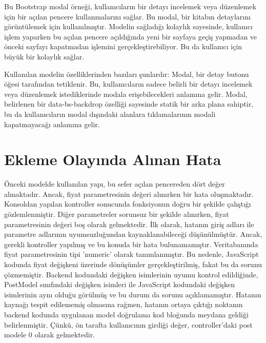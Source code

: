 \documentclass[12pt, a4paper]{article}
\begin{document}
Bu Bootstrap modal örneği, kullanıcıların bir detayı incelemek veya düzenlemek için bir açılan pencere kullanmalarını sağlar. Bu modal, bir kitabın detaylarını görüntülemek için kullanılmıştır. Modelin sağladığı kolaylık sayesinde, kullanıcı işlem yaparken bu açılan pencere açıldığında yeni bir sayfaya geçiş yapmadan ve önceki sayfayı kapatmadan işlemini gerçekleştirebiliyor. Bu da kullanıcı için büyük bir kolaylık sağlar.

Kullanılan modelin özelliklerinden bazıları şunlardır:
Modal, bir detay butonu öğesi tarafından tetiklenir. Bu, kullanıcıların sadece belirli bir detayı incelemek veya düzenlemek istediklerinde modala erişebilecekleri anlamına gelir. \newline
Modal, belirlenen bir data-bs-backdrop özelliği sayesinde statik bir arka plana sahiptir, bu da kullanıcıların modal dışındaki alanlara tıklamalarının modali kapatmayacağı anlamına gelir.
\newpage

\section{Ekleme Olayında Alınan Hata}
Önceki modelde kullanılan yapı, bu sefer açılan pencereden dört değer almaktadır. Ancak, fiyat parametresinin değeri alınırken bir hata oluşmaktadır. Konsoldan yapılan kontroller sonucunda fonksiyonun doğru bir şekilde çalıştığı gözlemlenmiştir. Diğer parametreler sorunsuz bir şekilde alınırken, fiyat parametresinin değeri boş olarak gelmektedir. İlk olarak, hatanın giriş adları ile parametre adlarının uyumsuzluğundan kaynaklanabileceği düşünülmüştür. Ancak, gerekli kontroller yapılmış ve bu konuda bir hata bulunamamıştır. Veritabanında fiyat parametresinin tipi 'numeric' olarak tanımlanmıştır. Bu nedenle, JavaScript kodunda fiyat değişkeni üzerinde dönüşümler gerçekleştirilmiş, fakat bu da sorunu çözmemiştir. Backend kodundaki değişken isimlerinin uyumu kontrol edildiğinde, PostModel sınıfındaki değişken isimleri ile JavaScript kodundaki değişken isimlerinin aynı olduğu görülmüş ve bu durum da sorunu açıklamamıştır. Hatanın kaynağı tespit edilememiş olmasına rağmen, hatanın ortaya çıktığı noktanın backend kodunda uygulanan model doğrulama kod bloğunda meydana geldiği belirlenmiştir. Çünkü, ön tarafta kullanıcının girdiği değer, controller'daki post modele 0 olarak gelmektedir.
\end{document}
